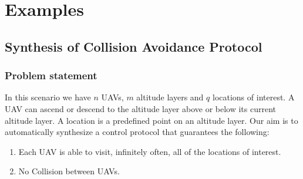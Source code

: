 \documentclass[]{article}
\author{}
\date{}
\begin{document}
\section{Examples}\label{examples}

\subsection{Synthesis of Collision Avoidance
Protocol}\label{synthesis-collision-avoidance-protocol}

\subsubsection{Problem statement}\label{problem-statement}

In this scenario we have $n$ UAVs, $m$ altitude layers and $q$ locations of
interest. A UAV can ascend or descend to the altitude layer above or
below its current altitude layer. A location is a predefined
point on an altitude layer. Our aim is to automatically synthesize a
control protocol that guarantees the following:

\begin{enumerate}
\def\labelenumi{\arabic{enumi}.}
\itemsep1pt\parskip0pt
\item
  Each UAV is able to visit, infinitely often, all of the locations of
  interest.
\item
  No Collision between UAVs.
\end{enumerate}
\end{document}
